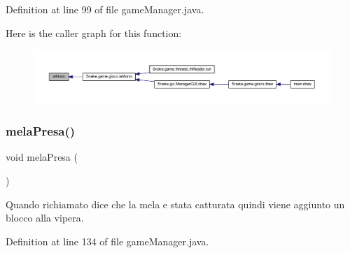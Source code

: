 Definition at line 99 of file game\+Manager.\+java.

Here is the caller graph for this function\+:
\nopagebreak
\begin{figure}[H]
\begin{center}
\leavevmode
\includegraphics[width=350pt]{class_snake_1_1game_1_1utility_1_1game_manager_aa90b60b508f662fce93e3e8250b2c304_icgraph}
\end{center}
\end{figure}
\mbox{\label{class_snake_1_1game_1_1utility_1_1game_manager_a3f6240b54a13e397255c9b3f7354cf45}} 
\subsubsection{\texorpdfstring{mela\+Presa()}{melaPresa()}}
{\footnotesize\ttfamily void mela\+Presa (\begin{DoxyParamCaption}{ }\end{DoxyParamCaption})}



Quando richiamato dice che la mela e\textquotesingle{} stata catturata quindi viene aggiunto un blocco alla vipera. 



Definition at line 134 of file game\+Manager.\+java.

